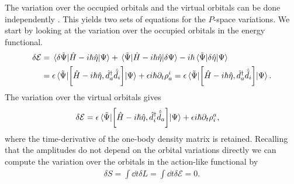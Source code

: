             The variation over the occupied orbitals and the virtual orbitals
            can be done independently \cite{kvaal2012ab}.
            This yields two sets of equations for the $P$-space variations.
            We start by looking at the variation over the occupied orbitals in
            the energy functional.
            \begin{align}
                \delta\mathcal{E}
                &=
                \mel*{\delta\tilde{\Psi}}{\hat{H} - i\hslash\hat{\eta}}{\Psi}
                +
                \mel*{\tilde{\Psi}}{\hat{H} - i\hslash\hat{\eta}}{\delta\Psi}
                -i\hslash
                \mel*{\tilde{\Psi}}{\delta\hat{\eta}}{\Psi}
                \\
                &=
                \epsilon
                \mel*{\tilde{\Psi}}{
                    \left[
                        \hat{H} - i\hslash\hat{\eta}
                    , 
                        \hat{d}^{\dagger}_{a}\hat{\tilde{d}}_{i}
                    \right]
                }{\Psi}
                + \epsilon i\hslash\partial_t\rho^{i}_{a}
                =
                \epsilon
                \mel*{\tilde{\Psi}}{
                    \left[
                        \hat{H} - i\hslash\hat{\eta}
                    , 
                        \hat{d}^{\dagger}_{a}\hat{\tilde{d}}_{i}
                    \right]
                }{\Psi}.
                \label{eq:occupied-variation}
            \end{align}
            The variation over the virtual orbitals gives
            \begin{align}
                \delta\mathcal{E}
                &=
                \epsilon
                \mel*{\tilde{\Psi}}{
                    \left[
                        \hat{H} - i\hslash\hat{\eta}
                    , 
                        \hat{d}^{\dagger}_{i}\hat{\tilde{d}}_{a}
                    \right]
                }{\Psi}
                + \epsilon i\hslash\partial_t\rho^{a}_{i},
                \label{eq:virtual-variation}
            \end{align}
            where the time-derivative of the one-body density matrix is
            retained.
            Recalling that the amplitudes do not depend on the orbital
            variations directly we can compute the variation over the orbitals
            in the action-like functional by
            \begin{align}
                \delta S
                = \int \dd t \delta L
                = \int \dd t \delta\mathcal{E}
                = 0.
            \end{align}
